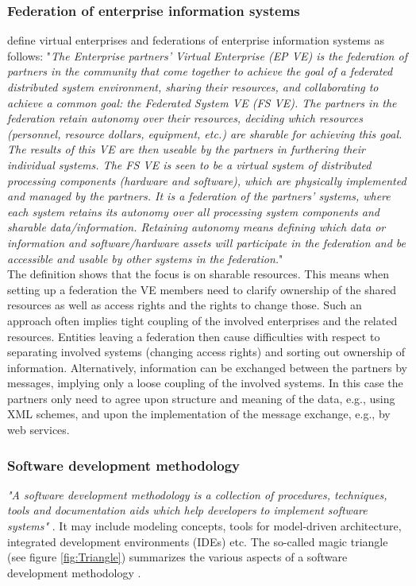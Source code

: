 \subsubsection{\textbf{Federation of enterprise information systems}}
\cite{article:VirtualEnterprise} define virtual enterprises and federations of enterprise information systems as follows: "\textit{The Enterprise partners' Virtual Enterprise (EP VE) is the federation of partners in the community that come together to achieve the goal of a federated distributed system environment, sharing their resources, and collaborating to achieve a common goal: the Federated System VE (FS VE). The partners in the federation retain autonomy over their resources, deciding which resources (personnel, resource dollars, equipment, etc.) are sharable for achieving this goal. The results of this VE are then useable by the partners in furthering their individual systems. The FS VE is seen to be a virtual system of distributed processing components (hardware and software), which are physically implemented and managed by the partners. It is a federation of the partners' systems, where each system retains its autonomy over all processing system components and sharable data/information. Retaining autonomy means defining which data or information and software/hardware assets will participate in the federation and be accessible and usable by other systems in the federation.}"\\
The definition shows that the focus is on sharable resources. This means when setting up a federation the VE members need to clarify ownership of the shared resources as well as access rights and the rights to change those. Such an approach often implies tight coupling of the involved enterprises and the related resources. Entities leaving a federation then cause difficulties with respect to separating involved systems (changing access rights) and sorting out ownership of information.
Alternatively, information can be exchanged between the partners by messages, implying only a loose coupling of the involved systems. In this case the partners only need to agree upon structure and meaning of the data, e.g., using XML schemes, and upon the implementation of the message exchange, e.g., by web services. 
\\
\subsubsection{\textbf{Software development methodology}}
\textit{"A software development methodology is a collection of procedures, techniques, tools and documentation aids which help developers to implement software systems"}  \cite{book:ISDevelopment}. It may include modeling concepts, tools for model-driven architecture, integrated development environments (IDEs) etc. The so-called magic triangle (see figure \ref{fig:Triangle}) summarizes the various aspects of a software development methodology \cite{book:SoftEng}.

